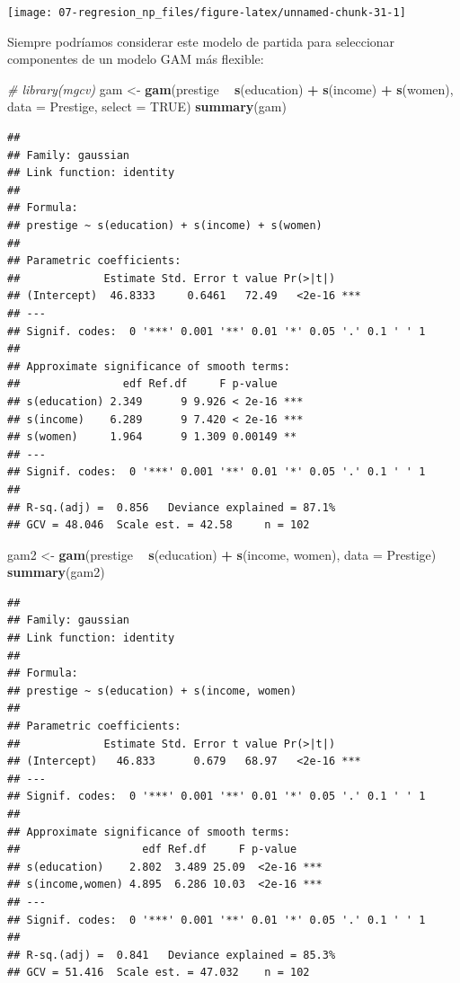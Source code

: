 \documentclass[
  spanish,
]{book}
\newenvironment{Shaded}{\begin{snugshade}}{\end{snugshade}}
\newcommand{\CommentTok}[1]{\textcolor[rgb]{0.56,0.35,0.01}{\textit{#1}}}
\newcommand{\DataTypeTok}[1]{\textcolor[rgb]{0.13,0.29,0.53}{#1}}
\newcommand{\KeywordTok}[1]{\textcolor[rgb]{0.13,0.29,0.53}{\textbf{#1}}}
\newcommand{\NormalTok}[1]{#1}
\newcommand{\OperatorTok}[1]{\textcolor[rgb]{0.81,0.36,0.00}{\textbf{#1}}}
\newcommand{\OtherTok}[1]{\textcolor[rgb]{0.56,0.35,0.01}{#1}}
\newcommand{\StringTok}[1]{\textcolor[rgb]{0.31,0.60,0.02}{#1}}
\theoremstyle{break}
\theoremstyle{definition}
\theoremstyle{definition}
\theoremstyle{definition}
\theoremstyle{remark}
\begin{document}
\begin{center}\texttt{[image: 07-regresion\_np\_files/figure-latex/unnamed-chunk-31-1]} \end{center}

Siempre podríamos considerar este modelo de partida para seleccionar componentes de un modelo GAM más flexible:

\begin{Shaded}
\begin{Highlighting}[]
\CommentTok{# library(mgcv)}
\NormalTok{gam <-}\StringTok{ }\KeywordTok{gam}\NormalTok{(prestige }\OperatorTok{~}\StringTok{ }\KeywordTok{s}\NormalTok{(education) }\OperatorTok{+}\StringTok{ }\KeywordTok{s}\NormalTok{(income) }\OperatorTok{+}\StringTok{ }\KeywordTok{s}\NormalTok{(women), }\DataTypeTok{data =}\NormalTok{ Prestige, }\DataTypeTok{select =} \OtherTok{TRUE}\NormalTok{)}
\KeywordTok{summary}\NormalTok{(gam)}
\end{Highlighting}
\end{Shaded}

\begin{verbatim}
## 
## Family: gaussian 
## Link function: identity 
## 
## Formula:
## prestige ~ s(education) + s(income) + s(women)
## 
## Parametric coefficients:
##             Estimate Std. Error t value Pr(>|t|)    
## (Intercept)  46.8333     0.6461   72.49   <2e-16 ***
## ---
## Signif. codes:  0 '***' 0.001 '**' 0.01 '*' 0.05 '.' 0.1 ' ' 1
## 
## Approximate significance of smooth terms:
##                edf Ref.df     F p-value    
## s(education) 2.349      9 9.926 < 2e-16 ***
## s(income)    6.289      9 7.420 < 2e-16 ***
## s(women)     1.964      9 1.309 0.00149 ** 
## ---
## Signif. codes:  0 '***' 0.001 '**' 0.01 '*' 0.05 '.' 0.1 ' ' 1
## 
## R-sq.(adj) =  0.856   Deviance explained = 87.1%
## GCV = 48.046  Scale est. = 42.58     n = 102
\end{verbatim}

\begin{Shaded}
\begin{Highlighting}[]
\NormalTok{gam2 <-}\StringTok{ }\KeywordTok{gam}\NormalTok{(prestige }\OperatorTok{~}\StringTok{ }\KeywordTok{s}\NormalTok{(education) }\OperatorTok{+}\StringTok{ }\KeywordTok{s}\NormalTok{(income, women), }\DataTypeTok{data =}\NormalTok{ Prestige)}
\KeywordTok{summary}\NormalTok{(gam2)}
\end{Highlighting}
\end{Shaded}

\begin{verbatim}
## 
## Family: gaussian 
## Link function: identity 
## 
## Formula:
## prestige ~ s(education) + s(income, women)
## 
## Parametric coefficients:
##             Estimate Std. Error t value Pr(>|t|)    
## (Intercept)   46.833      0.679   68.97   <2e-16 ***
## ---
## Signif. codes:  0 '***' 0.001 '**' 0.01 '*' 0.05 '.' 0.1 ' ' 1
## 
## Approximate significance of smooth terms:
##                   edf Ref.df     F p-value    
## s(education)    2.802  3.489 25.09  <2e-16 ***
## s(income,women) 4.895  6.286 10.03  <2e-16 ***
## ---
## Signif. codes:  0 '***' 0.001 '**' 0.01 '*' 0.05 '.' 0.1 ' ' 1
## 
## R-sq.(adj) =  0.841   Deviance explained = 85.3%
## GCV = 51.416  Scale est. = 47.032    n = 102
\end{verbatim}
\end{document}
